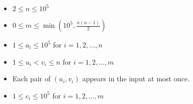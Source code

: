 \begin{itemize}
\tightlist
\item $2 \leq n \leq 10^5$
\item $0 \leq m \leq \min(10^5, \frac{n(n-1)}{2})$
\item $1 \leq a_i \leq 10^5$ for $i=1,2,\ldots,n$
\item $1 \leq u_i < v_i \leq n$ for $i = 1,2,\ldots,m$
\item Each pair of $(u_i, v_i)$ appears in the input at most once.
\item $1 \leq c_i \leq 10^5$ for $i = 1,2,\ldots,m$
\end{itemize}
